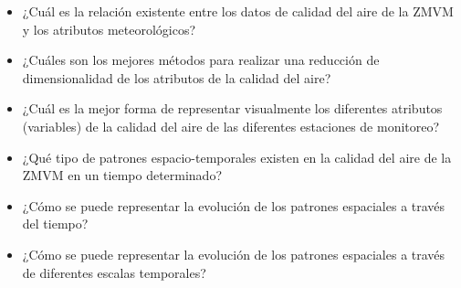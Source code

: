 \begin{itemize}
    \item ¿Cuál es la relación existente entre los datos de calidad del aire de la ZMVM y los atributos meteorológicos?
    \item ¿Cuáles son los mejores métodos para realizar una reducción de dimensionalidad de los atributos de la calidad del aire?
    \item ¿Cuál es la mejor forma de representar visualmente los diferentes atributos (variables) de la calidad del aire de las diferentes estaciones de monitoreo?
    \item ¿Qué tipo de patrones espacio-temporales existen en la calidad del aire de la ZMVM en un tiempo determinado?
    \item ¿Cómo se puede representar la evolución de los patrones espaciales a través del tiempo?
    \item ¿Cómo se puede representar la evolución de los patrones espaciales a través de diferentes escalas temporales?
\end{itemize}
